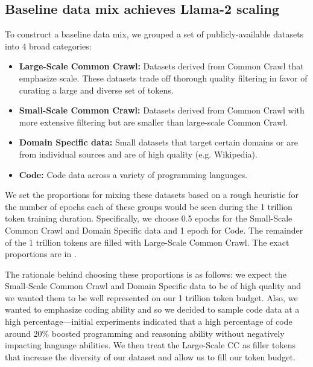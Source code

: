 \documentclass[10pt]{article} %
\begin{document}
\subsection{Baseline data mix achieves Llama-2 scaling}
\label{sec:data-mix}

To construct a baseline data mix, we grouped a set of publicly-available datasets into 4 broad categories:
\vspace{-1em}
\begin{itemize}
\itemsep0em 
\item \textbf{Large-Scale Common Crawl:} Datasets derived from Common Crawl that emphasize scale. These datasets trade off thorough quality filtering in favor of curating a large and diverse set of tokens.
\item \textbf{Small-Scale Common Crawl:} Datasets derived from Common Crawl with more extensive filtering but are smaller than large-scale Common Crawl.
\item \textbf{Domain Specific data:} Small datasets that target certain domains or are from individual sources and are of high quality (e.g. Wikipedia).
\item \textbf{Code:} Code data across a variety of programming languages.
\end{itemize}
\vspace{-1em}


We set the proportions for mixing these datasets based on a rough heuristic for the number of epochs each of these groups would be seen during the 1 trillion token training duration.
Specifically, we choose 0.5 epochs for the Small-Scale Common Crawl and Domain Specific data and 1 epoch for Code.
The remainder of the 1 trillion tokens are filled with Large-Scale Common Crawl.
The exact proportions are in .

The rationale behind choosing these proportions is as follows: we expect the Small-Scale Common Crawl and Domain Specific data to be of high quality and we wanted them to be well represented on our 1 trillion token budget. 
Also, we wanted to emphasize coding ability and so we decided to sample code data at a high percentage---initial experiments indicated that a high percentage of code around 20\% boosted programming and reasoning ability without negatively impacting language abilities.
We then treat the Large-Scale CC as filler tokens that increase the diversity of our dataset and allow us to fill our token budget.
\end{document}
